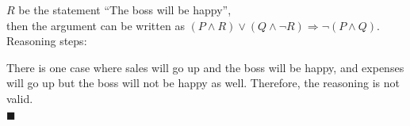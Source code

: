 \documentclass{report}
\newcommand{\qed}{‎\\‎\hfill$\blacksquare$\vspace{1em}}
\begin{document}
\begin{enumerate}[leftmargin=*]
\begin{enumerate}
                        $R$ be the statement ``The boss will be happy'',\\

                        then the argument can be written as $(P \wedge R) \vee (Q \wedge \neg R)
                              \Rightarrow \neg(P \wedge Q)$.\\

                        Reasoning steps:

                        There is one case where sales will go up and the boss will be happy, and
                        expenses will go up but the boss will not be happy as well. Therefore, the
                        reasoning is not valid. \qed
            \end{enumerate}
\end{enumerate}
\end{document}
